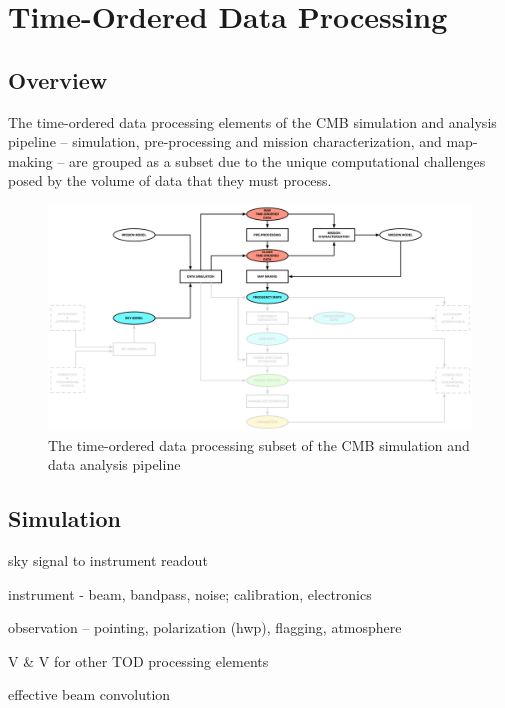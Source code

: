 
\section{Time-Ordered Data Processing}

\subsection{Overview}

The time-ordered data processing elements of the CMB simulation and analysis pipeline -- simulation, pre-processing and mission characterization, and map-making -- are grouped as a subset due to the unique computational challenges posed by the volume of data that they must process.

\begin{figure}[htbp]
\centering
\includegraphics[width=1\textwidth]{Analysis/td}
\caption{The time-ordered data processing subset of the CMB simulation and data analysis pipeline}
\label{fig_td}
\end{figure}

\subsection{Simulation}

sky signal to instrument readout

instrument - beam, bandpass, noise; calibration, electronics

observation -- pointing, polarization (hwp), flagging, atmosphere

V \& V for other TOD processing elements

effective beam convolution

